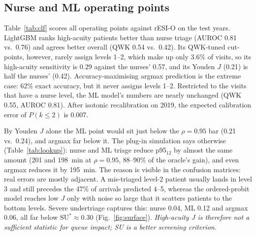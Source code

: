 \documentclass[conference]{IEEEtran}
\begin{document}
\subsection{Nurse and ML operating points}\label{sec:real}
Table~\ref{tab:clf} scores all operating points against rESI-O on the test years.
LightGBM ranks high-acuity patients better than nurse triage (AUROC 0.81 vs.\ 0.76) and
agrees better overall (QWK 0.54 vs.\ 0.42). Its QWK-tuned cut-points, however, rarely
assign levels 1--2, which make up only 3.6\% of visits, so its high-acuity sensitivity is
0.29 against the nurses' 0.57, and its Youden $J$ (0.21) is half the nurses' (0.42).
Accuracy-maximising argmax prediction is the extreme case: 62\% exact accuracy, but it
never assigns levels 1--2. Restricted to the visits that have a nurse level, the ML
model's numbers are nearly unchanged (QWK 0.55, AUROC 0.81). After isotonic recalibration
on 2019, the expected calibration error of $P(k\le2)$ is 0.007.

By Youden $J$ alone the ML point would sit just below the $\rho=0.95$ bar (0.21 vs.\
0.24), and argmax far below it. The plug-in simulation says otherwise
(Table~\ref{tab:lookup}): nurse and ML triage reduce p95$_{12}$ by almost the same amount
(201 and 198~min at $\rho=0.95$, 88--90\% of the oracle's gain), and even argmax
reduces it by 195~min. The reason is visible in the confusion matrices: real errors are
mostly adjacent. A mis-triaged level-2 patient usually lands in level 3 and still
precedes the 47\% of arrivals predicted 4--5, whereas the ordered-probit model reaches
low $J$ only with noise so large that it scatters patients to the bottom levels. Severe
undertriage captures this: nurse 0.04, ML 0.12 and argmax 0.06, all far below
$\mathrm{SU}^*\approx0.30$ (Fig.~\ref{fig:surface}). \emph{High-acuity $J$ is therefore not
a sufficient statistic for queue impact; SU is a better screening criterion.}
\end{document}
